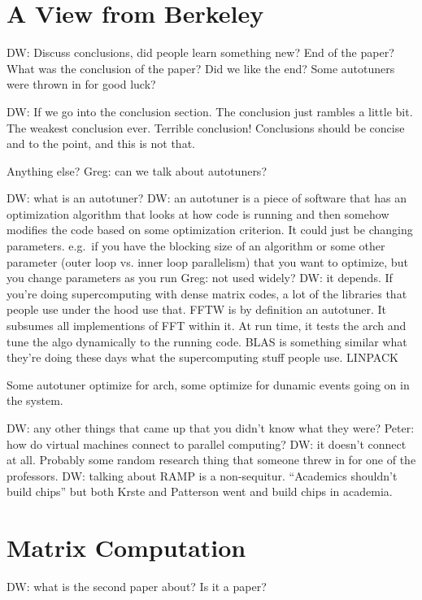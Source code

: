 



\section{A View from Berkeley}
DW: Discuss conclusions, did people learn something new? End of the paper?
What was the conclusion of the paper?
Did we like the end?
Some autotuners were thrown in for good luck?

DW: If we go into the conclusion section.
The conclusion just rambles a little bit.
The weakest conclusion ever.
Terrible conclusion!
Conclusions should be concise and to the point, and this is not that.

Anything else?
Greg: can we talk about autotuners?

DW: what is an autotuner?
DW: an autotuner is a piece of software that has an optimization algorithm that looks at how code is running and then somehow modifies the code based on some optimization criterion.
It could just be changing parameters.
e.g.\ if you have the blocking size of an algorithm or some other parameter (outer loop vs. inner loop parallelism) that you want to optimize, but you change parameters as you run
Greg: not used widely?
DW: it depends. If you're doing supercomputing with dense matrix codes, a lot of the libraries that people use under the hood use that.
FFTW is by definition an autotuner.
It subsumes all implementions of FFT within it.
At run time, it tests the arch and tune the algo dynamically to the running code.
BLAS is something similar what they're doing these days what the supercomputing stuff people use.
LINPACK

Some autotuner optimize for arch, some optimize for dunamic events going on in the system.

DW: any other things that came up that you didn't know what they were?
Peter: how do virtual machines connect to parallel computing?
DW: it doesn't connect at all. Probably some random research thing that someone threw in for one of the professors.
DW: talking about RAMP is a non-sequitur.
``Academics shouldn't build chips'' but both Krste and Patterson went and build chips in academia.

\section{Matrix Computation}
DW: what is the second paper about?
Is it a paper?

